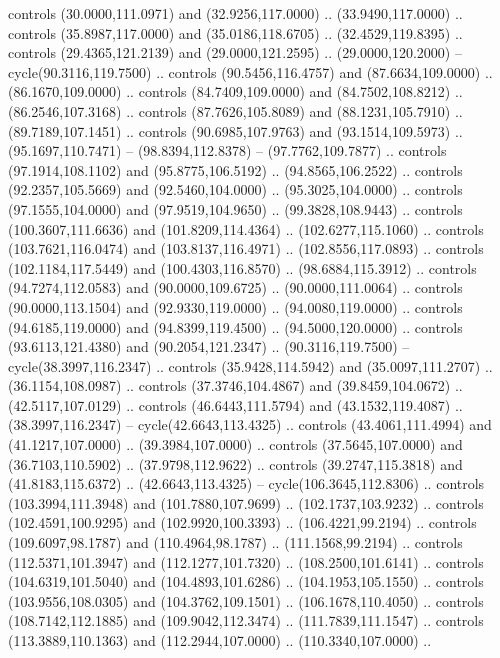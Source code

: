   controls (30.0000,111.0971) and (32.9256,117.0000) .. (33.9490,117.0000) ..
  controls (35.8987,117.0000) and (35.0186,118.6705) .. (32.4529,119.8395) ..
  controls (29.4365,121.2139) and (29.0000,121.2595) .. (29.0000,120.2000) --
  cycle(90.3116,119.7500) .. controls (90.5456,116.4757) and (87.6634,109.0000)
  .. (86.1670,109.0000) .. controls (84.7409,109.0000) and (84.7502,108.8212) ..
  (86.2546,107.3168) .. controls (87.7626,105.8089) and (88.1231,105.7910) ..
  (89.7189,107.1451) .. controls (90.6985,107.9763) and (93.1514,109.5973) ..
  (95.1697,110.7471) -- (98.8394,112.8378) -- (97.7762,109.7877) .. controls
  (97.1914,108.1102) and (95.8775,106.5192) .. (94.8565,106.2522) .. controls
  (92.2357,105.5669) and (92.5460,104.0000) .. (95.3025,104.0000) .. controls
  (97.1555,104.0000) and (97.9519,104.9650) .. (99.3828,108.9443) .. controls
  (100.3607,111.6636) and (101.8209,114.4364) .. (102.6277,115.1060) .. controls
  (103.7621,116.0474) and (103.8137,116.4971) .. (102.8556,117.0893) .. controls
  (102.1184,117.5449) and (100.4303,116.8570) .. (98.6884,115.3912) .. controls
  (94.7274,112.0583) and (90.0000,109.6725) .. (90.0000,111.0064) .. controls
  (90.0000,113.1504) and (92.9330,119.0000) .. (94.0080,119.0000) .. controls
  (94.6185,119.0000) and (94.8399,119.4500) .. (94.5000,120.0000) .. controls
  (93.6113,121.4380) and (90.2054,121.2347) .. (90.3116,119.7500) --
  cycle(38.3997,116.2347) .. controls (35.9428,114.5942) and (35.0097,111.2707)
  .. (36.1154,108.0987) .. controls (37.3746,104.4867) and (39.8459,104.0672) ..
  (42.5117,107.0129) .. controls (46.6443,111.5794) and (43.1532,119.4087) ..
  (38.3997,116.2347) -- cycle(42.6643,113.4325) .. controls (43.4061,111.4994)
  and (41.1217,107.0000) .. (39.3984,107.0000) .. controls (37.5645,107.0000)
  and (36.7103,110.5902) .. (37.9798,112.9622) .. controls (39.2747,115.3818)
  and (41.8183,115.6372) .. (42.6643,113.4325) -- cycle(106.3645,112.8306) ..
  controls (103.3994,111.3948) and (101.7880,107.9699) .. (102.1737,103.9232) ..
  controls (102.4591,100.9295) and (102.9920,100.3393) .. (106.4221,99.2194) ..
  controls (109.6097,98.1787) and (110.4964,98.1787) .. (111.1568,99.2194) ..
  controls (112.5371,101.3947) and (112.1277,101.7320) .. (108.2500,101.6141) ..
  controls (104.6319,101.5040) and (104.4893,101.6286) .. (104.1953,105.1550) ..
  controls (103.9556,108.0305) and (104.3762,109.1501) .. (106.1678,110.4050) ..
  controls (108.7142,112.1885) and (109.9042,112.3474) .. (111.7839,111.1547) ..
  controls (113.3889,110.1363) and (112.2944,107.0000) .. (110.3340,107.0000) ..
